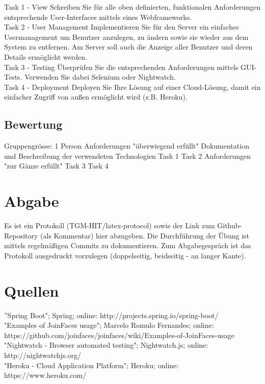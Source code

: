 Task 1 - View
Schreiben Sie für alle oben definierten, funktionalen Anforderungen entsprechende User-Interfaces mittels eines Webframeworks.\\

Task 2 - User Management
Implementieren Sie für den Server ein einfaches Usermanagement um Benutzer anzulegen, zu ändern sowie sie wieder aus dem System zu entfernen. Am Server soll auch die Anzeige aller Benutzer und deren Details ermöglicht werden.\\

Task 3 - Testing
Überprüfen Sie die entsprechenden Anforderungen mittels GUI-Tests. Verwenden Sie dabei Selenium oder Nightwatch.\\

Task 4 - Deployment
Deployen Sie Ihre Lösung auf einer Cloud-Lösung, damit ein einfacher Zugriff von außen ermöglicht wird (z.B. Heroku).\\

\subsection{Bewertung} 

Gruppengrösse: 1 Person
Anforderungen "überwiegend erfüllt"
Dokumentation und Beschreibung der verwendeten Technologien
Task 1
Task 2
Anforderungen "zur Gänze erfüllt"
Task 3
Task 4

\clearpage

\section{Abgabe}

Es ist ein Protokoll (TGM-HIT/latex-protocol) sowie der Link zum Github-Repository (als Kommentar) hier abzugeben. Die Durchführung der Übung ist mittels regelmäßigen Commits zu dokumentieren. Zum Abgabegespräch ist das Protokoll ausgedruckt vorzulegen (doppelseitig, beidseitig - an langer Kante).

\section{Quellen} 

''Spring Boot"; Spring; online: http://projects.spring.io/spring-boot/\\
"Examples of JoinFaces usage"; Marcelo Romulo Fernandes; online:\\ https://github.com/joinfaces/joinfaces/wiki/Examples-of-JoinFaces-usage\\
"Nightwatch - Browser automated testing"; Nightwatch.js; online: http://nightwatchjs.org/\\
"Heroku - Cloud Application Platform"; Heroku; online: https://www.heroku.com/